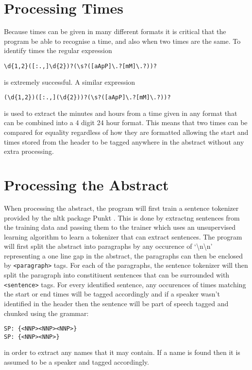 \documentclass[draft]{article}
\begin{document}
\begin{multicols*}{2}
\section*{Processing Times}
Because times can be given in many different formats it is critical that the program be able to recognise a time, and also when two times are the same. To identify times the regular expression 
\begin{verbatim}
\d{1,2}([:.,]\d{2})?(\s?([aApP]\.?[mM]\.?))?
\end{verbatim} is extremely successful. A similar expression
\begin{verbatim}
(\d{1,2})([:.,](\d{2}))?(\s?([aApP]\.?[mM]\.?))?
\end{verbatim} is used to extract the minutes and hours from a time given in any format that can be combined into a 4 digit 24 hour format. This means that two times can be compared for equality regardless of how they are formatted allowing the start and times stored from the header to be tagged anywhere in the abstract without any extra processing.

\section*{Processing the Abstract}
When processing the abstract, the program will first train a sentence tokenizer provided by the nltk package Punkt \citep{senttok}. This is done by extractng sentences from the training data and passing them to the trainer which uses an unsupervised learning algorithm \citep{compling} to learn a tokenizer that can extract sentences. The program will first split the abstract into paragraphs by any occurence of `\textbackslash n\textbackslash n' representing a one line gap in the abstract, the paragraphs can then be enclosed by \texttt{<paragraph>} tags. For each of the paragraphs, the sentence tokenizer will then split the paragraph into constitiuent sentences that can be surrounded with \texttt{<sentence>} tags. For every identified sentence, any occurences of times matching the start or end times will be tagged accordingly and if a speaker wasn't identified in the header then the sentence will be part of speech tagged and chunked using the grammar:
\begin{verbatim}
SP: {<NNP><NNP><NNP>}
SP: {<NNP><NNP>}
\end{verbatim} 
in order to extract any names that it may contain. If a name 
is found then it is assumed to be a speaker and tagged accordingly.


\end{multicols*}
\end{document}
